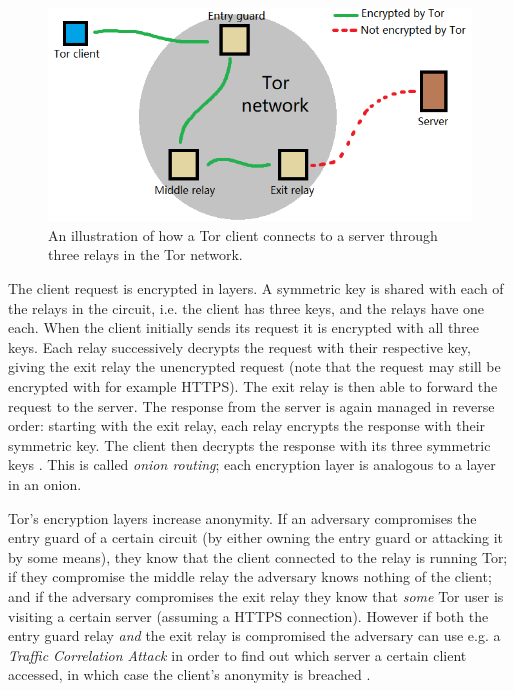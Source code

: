 \documentclass{kththesis}
\begin{document}
\begin{figure}[!htb]
    \centering
    \includegraphics[width=350pt]{resources/paint_tor_circuit.png}
    \caption{An illustration of how a Tor client connects to a server through three relays in the Tor network.}
    \label{fig:torCircuit}
\end{figure}

The client request is encrypted in layers. A symmetric key is shared with each of the relays in the circuit, i.e. the client has three keys, and the relays have one each. When the client initially sends its request it is encrypted with all three keys. Each relay successively decrypts the request with their respective key, giving the exit relay the unencrypted request (note that the request may still be encrypted with for example HTTPS). The exit relay is then able to forward the request to the server. The response from the server is again managed in reverse order: starting with the exit relay, each relay encrypts the response with their symmetric key. The client then decrypts the response with its three symmetric keys \parencite{TorOnionRouter}\parencite{UnderstandingTor}. This is called \emph{onion routing}; each encryption layer is analogous to a layer in an onion. 

Tor's encryption layers increase anonymity. If an adversary compromises the entry guard of a certain circuit (by either owning the entry guard or attacking it by some means), they know that the client connected to the relay is running Tor; if they compromise the middle relay the adversary knows nothing of the client; and if the adversary compromises the exit relay they know that \emph{some} Tor user is visiting a certain server (assuming a HTTPS connection). However if both the entry guard relay \emph{and} the exit relay is compromised the adversary can use e.g. a \emph{Traffic Correlation Attack} \parencite{CLAPS} in order to find out which server a certain client accessed, in which case the client's anonymity is breached \parencite{TorOnionRouter}.
\end{document}
